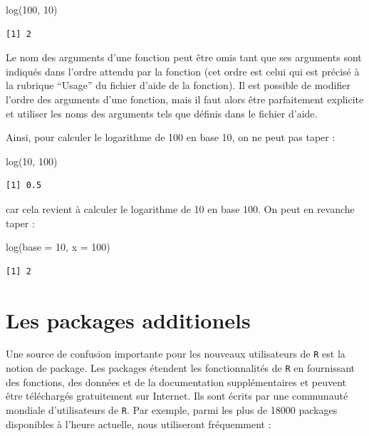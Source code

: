 \documentclass[
  letterpaper,
  DIV=11,
  numbers=noendperiod]{scrreprt}
\newenvironment{Shaded}{\begin{snugshade}}{\end{snugshade}}
\newcommand{\AttributeTok}[1]{\textcolor[rgb]{0.40,0.45,0.13}{#1}}
\newcommand{\DecValTok}[1]{\textcolor[rgb]{0.68,0.00,0.00}{#1}}
\newcommand{\FunctionTok}[1]{\textcolor[rgb]{0.28,0.35,0.67}{#1}}
\newcommand{\NormalTok}[1]{\textcolor[rgb]{0.00,0.23,0.31}{#1}}
\begin{document}
\begin{Shaded}
\begin{Highlighting}[]
\FunctionTok{log}\NormalTok{(}\DecValTok{100}\NormalTok{, }\DecValTok{10}\NormalTok{)}
\end{Highlighting}
\end{Shaded}

\begin{verbatim}
[1] 2
\end{verbatim}

Le nom des arguments d'une fonction peut être omis tant que ses
arguments sont indiqués dans l'ordre attendu par la fonction (cet ordre
est celui qui est précisé à la rubrique ``Usage'' du fichier d'aide de
la fonction). Il est possible de modifier l'ordre des arguments d'une
fonction, mais il faut alors être parfaitement explicite et utiliser les
noms des arguments tels que définis dans le fichier d'aide.

Ainsi, pour calculer le logarithme de 100 en base 10, on ne peut pas
taper :

\begin{Shaded}
\begin{Highlighting}[]
\FunctionTok{log}\NormalTok{(}\DecValTok{10}\NormalTok{, }\DecValTok{100}\NormalTok{)}
\end{Highlighting}
\end{Shaded}

\begin{verbatim}
[1] 0.5
\end{verbatim}

car cela revient à calculer le logarithme de 10 en base 100. On peut en
revanche taper :

\begin{Shaded}
\begin{Highlighting}[]
\FunctionTok{log}\NormalTok{(}\AttributeTok{base =} \DecValTok{10}\NormalTok{, }\AttributeTok{x =} \DecValTok{100}\NormalTok{)}
\end{Highlighting}
\end{Shaded}

\begin{verbatim}
[1] 2
\end{verbatim}

\hypertarget{sec-packages}{%
\section{Les packages additionels}\label{sec-packages}}

Une source de confusion importante pour les nouveaux utilisateurs de
\texttt{R} est la notion de package. Les packages étendent les
fonctionnalités de \texttt{R} en fournissant des fonctions, des données
et de la documentation supplémentaires et peuvent être téléchargés
gratuitement sur Internet. Ils sont écrits par une communauté mondiale
d'utilisateurs de \texttt{R}. Par exemple, parmi les plus de 18000
packages disponibles à l'heure actuelle, nous utiliseront fréquemment :
\end{document}
